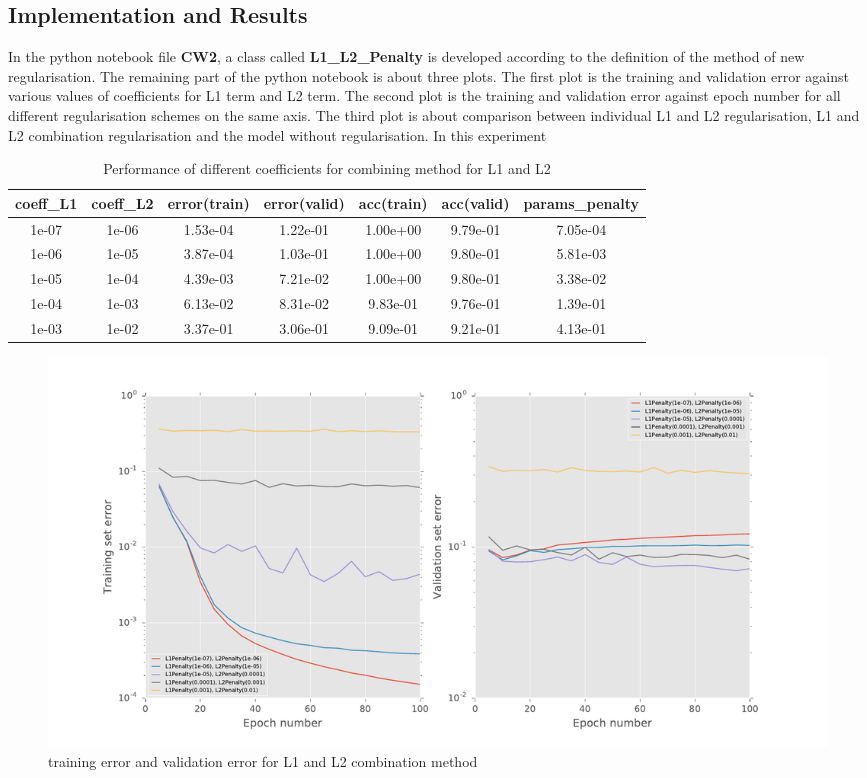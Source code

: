 \documentclass[11pt]{article}
\begin{document}
\subsection{Implementation and Results}
In the python notebook file {\bf CW2}, a class called {\bf L1\_L2\_Penalty} is developed according to the definition of the method of new regularisation. The remaining part of the python notebook is about three plots. The first plot is the training and validation error against various values of coefficients for L1 term and L2 term. The second plot is the training and validation error against epoch number for all different regularisation schemes on the same axis. The third plot is about comparison between individual L1 and L2 regularisation, L1 and L2 combination regularisation and the model without regularisation. 
In this experiment 
\begin{table}
\begin{center}
\begin{tabular}{ c  c c c c  c c} 
\hline
coeff\_L1 & coeff\_L2 &error(train) & error(valid) & acc(train) & acc(valid) & params\_penalty\\
\hline
\hline
1e-07& 1e-06	&1.53e-04 & 1.22e-01 & 1.00e+00 & 9.79e-01 &7.05e-04\\ 
1e-06 & 1e-05  	&3.87e-04 & 1.03e-01 & 1.00e+00 & 9.80e-01 &5.81e-03\\ 
1e-05 &1e-04	 &4.39e-03 & 7.21e-02 & 1.00e+00 & 9.80e-01 &3.38e-02\\ 
1e-04 & 1e-03 & 6.13e-02  &  8.31e-02  &  9.83e-01 & 9.76e-01  &  1.39e-01\\
1e-03 & 1e-02 &3.37e-01&  3.06e-01   & 9.09e-01 & 9.21e-01 &4.13e-01\\
\end{tabular}
\caption{Performance of different coefficients for combining method for L1 and L2}
\label{tb:L1_L2_combine}
\end{center}	
\end{table}

\begin{figure}[h]
\centering 
  \includegraphics[width=1\textwidth]{L1_L2.pdf}
  \caption{training error and validation error for L1 and L2 combination method}
  \label{fg:L1_L2_combine}
\end{figure}
\end{document}
